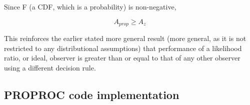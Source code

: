 \documentclass[
]{book}
\begin{document}
Since F (a CDF, which is a probability) is non-negative,

\begin{equation} 
A_{prop}\ge A_z
\label{eq:proper-roc-models-area-proproc-az-inequality}
\end{equation}

This reinforces the earlier stated more general result (more general, as it is not restricted to any distributional assumptions) that performance of a likelihood ratio, or ideal, observer is greater than or equal to that of any other observer using a different decision rule.

\hypertarget{proper-roc-models-proproc-code}{%
\subsection{PROPROC code implementation}\label{proper-roc-models-proproc-code}}
\end{document}
